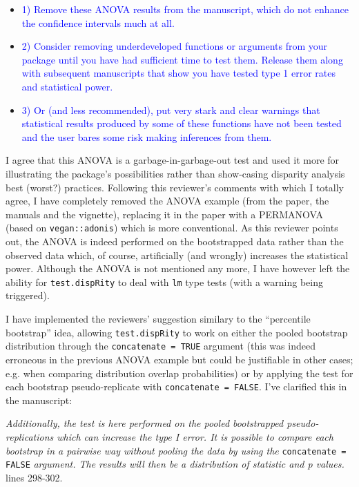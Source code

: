 \documentclass[12pt,letterpaper]{article}
\begin{document}
\begin{enumerate}
\begin{itemize}
\item \textcolor{blue}{1) Remove these ANOVA results from the manuscript, which do not enhance the confidence intervals much at all.}

\item \textcolor{blue}{2) Consider removing underdeveloped functions or arguments from your package until you have had sufficient time to test them.  Release them along with subsequent manuscripts that show you have tested type 1 error rates and statistical power.}

\item \textcolor{blue}{3) Or (and less recommended), put very stark and clear warnings that statistical results produced by some of these functions have not been tested and the user bares some risk making inferences from them.}

\end{itemize}

\label{ANOVA}

I agree that this ANOVA is a garbage-in-garbage-out test and used it more for illustrating the package's possibilities rather than show-casing disparity analysis best (worst?) practices.
Following this reviewer's comments with which I totally agree, I have completely removed the ANOVA example (from the paper, the manuals and the vignette), replacing it in the paper with a PERMANOVA (based on \texttt{vegan::adonis}) which is more conventional.
As this reviewer points out, the ANOVA is indeed performed on the bootstrapped data rather than the observed data which, of course, artificially (and wrongly) increases the statistical power.
Although the ANOVA is not mentioned any more, I have however left the ability for \texttt{test.dispRity} to deal with \texttt{lm} type tests (with a warning being triggered).

I have implemented the reviewers' suggestion similary to the ``percentile bootstrap'' idea, allowing \texttt{test.dispRity} to work on either the pooled bootstrap distribution through the \texttt{concatenate = TRUE} argument (this was indeed erroneous in the previous ANOVA example but could be justifiable in other cases; e.g. when comparing distribution overlap probabilities) or by applying the test for each bootstrap pseudo-replicate with \texttt{concatenate = FALSE}. I've clarified this in the manuscript:

\textit{Additionally, the test is here performed on the pooled bootstrapped pseudo-replications which can increase the type I error.
It is possible to compare each bootstrap in a pairwise way without pooling the data by using the} \texttt{concatenate = FALSE} \textit{argument.
The results will then be a distribution of statistic and p values.} lines 298-302.


\end{enumerate}
\end{document}
